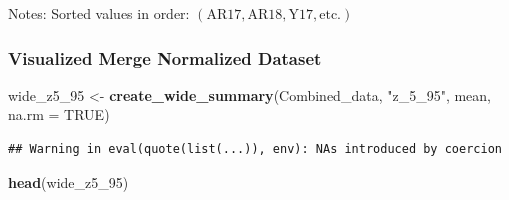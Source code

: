 \documentclass[
]{article}
\newenvironment{Shaded}{\begin{snugshade}}{\end{snugshade}}
\newcommand{\AttributeTok}[1]{\textcolor[rgb]{0.13,0.29,0.53}{#1}}
\newcommand{\CommentTok}[1]{\textcolor[rgb]{0.56,0.35,0.01}{\textit{#1}}}
\newcommand{\ConstantTok}[1]{\textcolor[rgb]{0.56,0.35,0.01}{#1}}
\newcommand{\DecValTok}[1]{\textcolor[rgb]{0.00,0.00,0.81}{#1}}
\newcommand{\FunctionTok}[1]{\textcolor[rgb]{0.13,0.29,0.53}{\textbf{#1}}}
\newcommand{\NormalTok}[1]{#1}
\newcommand{\OtherTok}[1]{\textcolor[rgb]{0.56,0.35,0.01}{#1}}
\newcommand{\SpecialCharTok}[1]{\textcolor[rgb]{0.81,0.36,0.00}{\textbf{#1}}}
\newcommand{\StringTok}[1]{\textcolor[rgb]{0.31,0.60,0.02}{#1}}
\begin{document}
\begin{Shaded}
\end{Shaded}

Notes: Sorted values in order:
\((\text{AR17}, \text{AR18}, \text{Y17}, \text{etc.})\)

\subsubsection{Visualized Merge Normalized
Dataset}\label{visualized-merge-normalized-dataset}

\begin{Shaded}
\begin{Highlighting}[]
\NormalTok{wide\_z5\_95 }\OtherTok{\textless{}{-}} \FunctionTok{create\_wide\_summary}\NormalTok{(Combined\_data, }\StringTok{"z\_5\_95"}\NormalTok{, mean, }\AttributeTok{na.rm =} \ConstantTok{TRUE}\NormalTok{)}
\end{Highlighting}
\end{Shaded}

\begin{verbatim}
## Warning in eval(quote(list(...)), env): NAs introduced by coercion
\end{verbatim}

\begin{Shaded}
\begin{Highlighting}[]
\FunctionTok{head}\NormalTok{(wide\_z5\_95)}
\end{Highlighting}
\end{Shaded}
\end{document}
